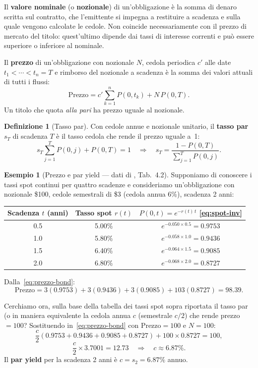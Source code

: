 \documentclass[11pt,a4paper]{article}
\theoremstyle{plain}
\theoremstyle{definition}
\newtheorem{definizione}[teorema]{Definizione}
\newtheorem{esempio}[teorema]{Esempio}
\theoremstyle{remark}
\begin{document}
Il \textbf{valore nominale} (o \textbf{nozionale}) di un'obbligazione \`e la somma di
denaro scritta sul contratto, che l'emittente si impegna a restituire a scadenza e sulla
quale vengono calcolate le cedole. Non coincide necessariamente con il prezzo di mercato
del titolo: quest'ultimo dipende dai tassi di interesse correnti e pu\`o essere superiore
o inferiore al nominale.

Il \textbf{prezzo} di un'obbligazione con nozionale $N$, cedola periodica $c'$ alle
date $t_1 < \cdots < t_n = T$ e rimborso del nozionale a scadenza \`e la somma dei valori
attuali di tutti i flussi:
\begin{equation}
  \text{Prezzo} = c' \sum_{k=1}^{n} P(0,t_k) + N\,P(0,T).
  \label{eq:prezzo-bond}
\end{equation}
Un titolo che quota \emph{alla pari} ha prezzo uguale al nozionale.
\begin{definizione}[Tasso par]
\label{def:par}
Con cedole annue e nozionale unitario, il \textbf{tasso par} $s_T$ di scadenza $T$ \`e
il tasso cedola che rende il prezzo uguale a~1:
\[
  s_T \sum_{j=1}^{T} P(0,j) + P(0,T) = 1
  \quad\Longrightarrow\quad
  s_T = \frac{1 - P(0,T)}{\displaystyle\sum_{j=1}^{T} P(0,j)}.
\]
\end{definizione}
\begin{esempio}[Prezzo e par yield --- dati di \cite{hull2018}, Tab.~4.2]
\label{ex:hull42}
Supponiamo di conoscere i tassi spot continui per quattro scadenze e consideriamo un'obbligazione con nozionale \$100, cedole semestrali di \$3 (cedola
annua 6\%), scadenza 2 anni:
\begin{center}\small
\renewcommand{\arraystretch}{1.2}
\begin{tabular}{ccc}
\toprule
Scadenza $t$ (anni) & Tasso spot $r(t)$ & $P(0,t) = e^{-r(t)\,t}$ \eqref{eq:spot-inv} \\
\midrule
0.5 & 5.00\% & $e^{-0.050\times 0.5} = 0.9753$ \\
1.0 & 5.80\% & $e^{-0.058\times 1.0} = 0.9436$ \\
1.5 & 6.40\% & $e^{-0.064\times 1.5} = 0.9085$ \\
2.0 & 6.80\% & $e^{-0.068\times 2.0} = 0.8727$ \\
\bottomrule
\end{tabular}
\end{center}

 Dalla~\eqref{eq:prezzo-bond}:
\[
  \text{Prezzo}
  = 3(0.9753) + 3(0.9436) + 3(0.9085) + 103(0.8727)
  = 98.39.
\]

Cerchiamo ora, sulla base della tabella dei tassi spot sopra riportata il tasso par (o in maniera equivalente la cedola annua $c$ (semestrale $c/2$) che rende prezzo $= 100$?
Sostituendo in~\eqref{eq:prezzo-bond} con $\text{Prezzo}=100$ e $N=100$:
\[
  \frac{c}{2}(0.9753 + 0.9436 + 0.9085 + 0.8727) + 100\times 0.8727 = 100,
\]
\[
  \frac{c}{2}\times 3.7001 = 12.73
  \quad\Longrightarrow\quad
  c \approx 6.87\%.
\]
Il \textbf{par yield} per la scadenza 2 anni \`e $c = s_2 = 6.87\%$ annuo.%
\end{esempio}
\end{document}
